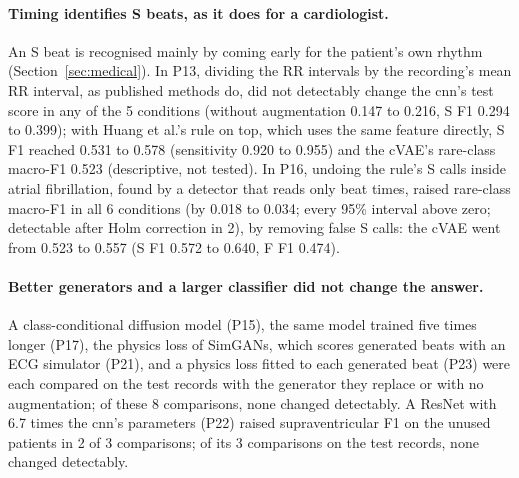 \paragraph{Timing identifies S beats, as it does for a cardiologist.} An S beat is recognised mainly by coming early for the patient's own rhythm (Section~\ref{sec:medical}). In P13, dividing the RR intervals by the recording's mean RR interval, as published methods do, did not detectably change the cnn's test score in any of the 5 conditions (without augmentation 0.147 to 0.216, S F1 0.294 to 0.399); with Huang et al.'s rule on top, which uses the same feature directly, S F1 reached 0.531 to 0.578 (sensitivity 0.920 to 0.955) and the cVAE's rare-class macro-F1 0.523 (descriptive, not tested). In P16, undoing the rule's S calls inside atrial fibrillation, found by a detector that reads only beat times, raised rare-class macro-F1 in all 6 conditions (by 0.018 to 0.034; every 95\% interval above zero; detectable after Holm correction in 2), by removing false S calls: the cVAE went from 0.523 to 0.557 (S F1 0.572 to 0.640, F F1 0.474).

\paragraph{Better generators and a larger classifier did not change the answer.} A class-conditional diffusion model (P15), the same model trained five times longer (P17), the physics loss of SimGANs, which scores generated beats with an ECG simulator (P21), and a physics loss fitted to each generated beat (P23) were each compared on the test records with the generator they replace or with no augmentation; of these 8 comparisons, none changed detectably. A ResNet with 6.7 times the cnn's parameters (P22) raised supraventricular F1 on the unused patients in 2 of 3 comparisons; of its 3 comparisons on the test records, none changed detectably.

